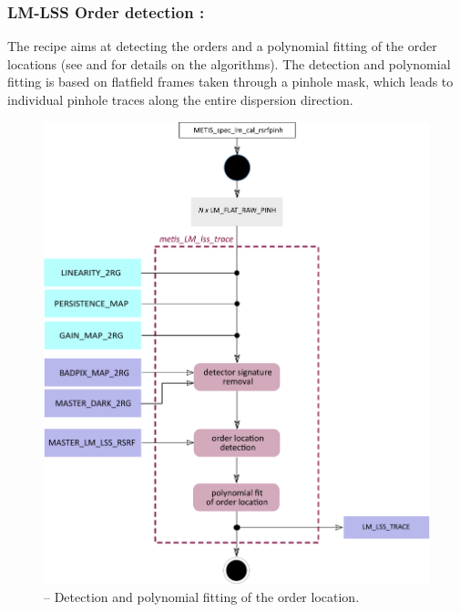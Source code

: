\subsubsection{LM-LSS Order detection :}\label{rec:metis_lm_lss_trace}
The recipe \hyperref[rec:metis_lm_lss_trace]{} aims at detecting the orders and a polynomial fitting of the order locations (see \cite{pis02} and \cite{pis21} for details on the algorithms). The detection and polynomial fitting is based on flatfield frames taken through a pinhole mask, which leads to individual pinhole traces along the entire dispersion direction.

\begin{figure}[ht]
  \centering
  \includegraphics[width=0.5\textheight]{figures/metis_lm_lss_trace_v0.83.pdf}
  \caption[Recipe: ]{ --
    Detection and polynomial fitting of the order location.}
  \label{Fig:rec_lm_lss_wtrace}
\end{figure}

